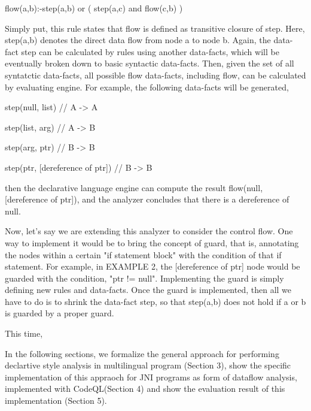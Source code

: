 flow(a,b):-step(a,b) or ( step(a,c) and flow(c,b) )

Simply put, this rule states that flow is defined as transitive closure of step.
Here, step(a,b) denotes the direct data flow from node a to node b. Again, the
data-fact step can be calculated by rules using another data-facts, which will
be eventually broken down to basic syntactic data-facts. Then, given the set of
all syntatctic data-facts, all possible flow data-facts, including flow, can be
calculated by evaluating engine. For example, the following data-facts will be
generated,

step(null, list) // A -> A

step(list, arg) // A -> B

step(arg, ptr) // B -> B

step(ptr, [dereference of ptr]) // B -> B

then the declarative language engine can compute the result flow(null,
[dereference of ptr]), and the analyzer concludes that there is a dereference
of null.

Now, let's say we are extending this analyzer to consider the control flow.
One way to implement it would be to bring the concept of guard, that is,
annotating the nodes within a certain "if statement block" with the condition
of that if statement.  For example, in EXAMPLE 2, the [dereference of ptr] node
would be guarded with the condition, "ptr != null".  Implementing the guard is
simply defining new rules and data-facts. Once the guard is implemented, then
all we have to do is to shrink the data-fact step, so that step(a,b) does not
hold if a or b is guarded by a proper guard.

This time, 

In the following sections, we formalize the general approach for performing
declartive style analysis in multilingual program (Section 3), show the
specific implementation of this appraoch for JNI programs as form of dataflow
analysis, implemented with CodeQL(Section 4) and show the evaluation result of
this implementation (Section 5).
